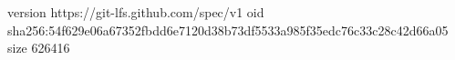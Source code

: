 version https://git-lfs.github.com/spec/v1
oid sha256:54f629e06a67352fbdd6e7120d38b73df5533a985f35edc76c33c28c42d66a05
size 626416
